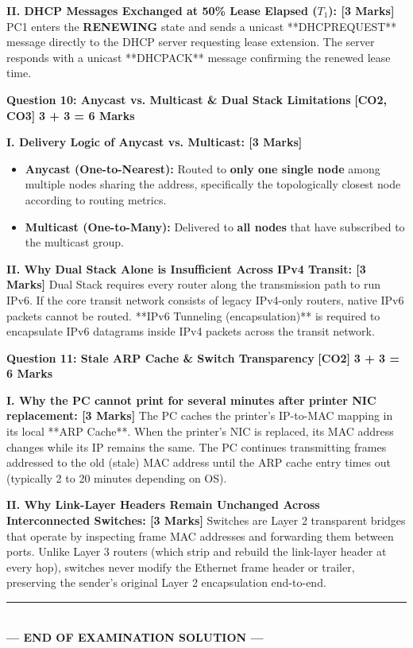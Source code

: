 \documentclass[11pt,a4paper]{article}
\newcommand{\questionheader}[3]{
    \vspace{0.35cm}
    \noindent\colorbox{qboxbg}{
        \parbox{\dimexpr\textwidth-2\fboxsep\relax}{
            \textbf{\textcolor{primary}{\large #1}} \hfill \textbf{\textcolor{accent}{[#2]}} \hfill \textbf{\textcolor{secondary}{#3 Marks}}
        }
    }
    \vspace{0.15cm}
}
\begin{document}
\textbf{II. DHCP Messages Exchanged at 50\% Lease Elapsed ($T_1$): [3 Marks]}
PC1 enters the \textbf{RENEWING} state and sends a unicast **DHCPREQUEST** message directly to the DHCP server requesting lease extension. The server responds with a unicast **DHCPACK** message confirming the renewed lease time.

\questionheader{Question 10: Anycast vs. Multicast \& Dual Stack Limitations}{CO2, CO3}{3 + 3 = 6}

\textbf{I. Delivery Logic of Anycast vs. Multicast: [3 Marks]}
\begin{itemize}
    \item \textbf{Anycast (One-to-Nearest):} Routed to \textbf{only one single node} among multiple nodes sharing the address, specifically the topologically closest node according to routing metrics.
    \item \textbf{Multicast (One-to-Many):} Delivered to \textbf{all nodes} that have subscribed to the multicast group.
\end{itemize}

\textbf{II. Why Dual Stack Alone is Insufficient Across IPv4 Transit: [3 Marks]}
Dual Stack requires every router along the transmission path to run IPv6. If the core transit network consists of legacy IPv4-only routers, native IPv6 packets cannot be routed. **IPv6 Tunneling (encapsulation)** is required to encapsulate IPv6 datagrams inside IPv4 packets across the transit network.

\questionheader{Question 11: Stale ARP Cache \& Switch Transparency}{CO2}{3 + 3 = 6}

\textbf{I. Why the PC cannot print for several minutes after printer NIC replacement: [3 Marks]}
The PC caches the printer's IP-to-MAC mapping in its local **ARP Cache**. When the printer's NIC is replaced, its MAC address changes while its IP remains the same. The PC continues transmitting frames addressed to the old (stale) MAC address until the ARP cache entry times out (typically 2 to 20 minutes depending on OS).

\textbf{II. Why Link-Layer Headers Remain Unchanged Across Interconnected Switches: [3 Marks]}
Switches are Layer 2 transparent bridges that operate by inspecting frame MAC addresses and forwarding them between ports. Unlike Layer 3 routers (which strip and rebuild the link-layer header at every hop), switches never modify the Ethernet frame header or trailer, preserving the sender's original Layer 2 encapsulation end-to-end.

\begin{center}
    \rule{\textwidth}{0.8pt}\\[3pt]
    \textbf{\textcolor{primary}{--- END OF EXAMINATION SOLUTION ---}}
\end{center}
\end{document}
